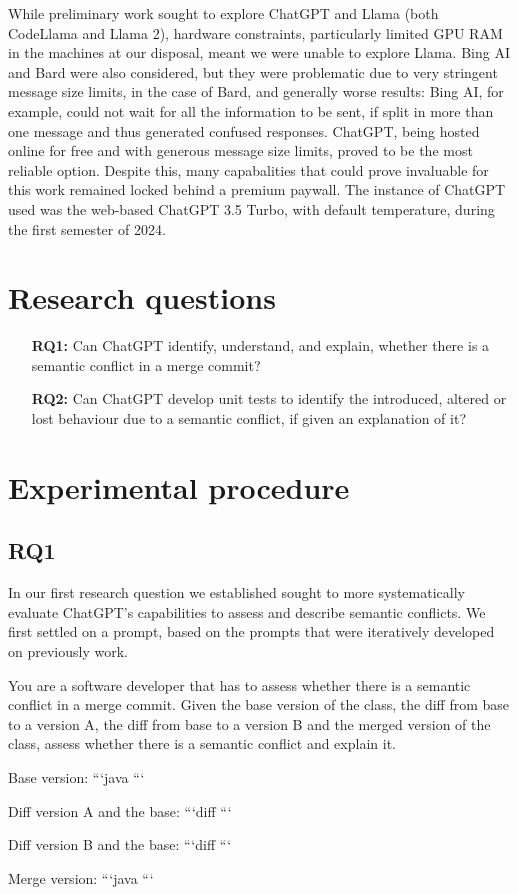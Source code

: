 While preliminary work sought to explore ChatGPT and Llama (both CodeLlama and Llama 2), hardware constraints, particularly limited GPU RAM in the machines at our disposal, meant we were unable to explore Llama.  Bing AI and Bard were also considered, but they were problematic due to very stringent message size limits, in the case of Bard, and generally worse results: Bing AI, for example, could not wait for all the information to be sent, if split in more than one message and thus generated confused responses. ChatGPT, being hosted online for free and with generous message size limits, proved to be the most reliable option. Despite this, many capabalities that could prove invaluable for this work remained locked behind a premium paywall.
The instance of ChatGPT used was the web-based ChatGPT 3.5 Turbo, with default temperature, during the first semester of 2024.

\section{Research questions}

\begin{itemize}
  \item[\textbf{RQ1:}] Can ChatGPT identify, understand, and explain, whether
  there is a semantic conflict in a merge commit?

  \item[\textbf{RQ2:}] Can ChatGPT develop unit tests to identify the introduced, altered or lost behaviour due to a semantic conflict, if given an explanation of it?
\end{itemize}

\section{Experimental procedure}

\subsection{RQ1}

In our first research question we established sought to more systematically evaluate ChatGPT's capabilities to assess and describe semantic conflicts.
We first settled on a prompt, based on the prompts that were iteratively developed on previously work.

\begin{prompt}
You are a software developer that has to assess whether there is a semantic conflict in a merge commit.  Given the base version of the class, the diff from base to a version A, the diff from base to a version B and the merged version of the class, assess whether there is a semantic conflict and explain it.

Base version:
```java
```

Diff version A and the base:
```diff
```

Diff version B and the base:
```diff
```

Merge version:
```java
```
\end{prompt}

